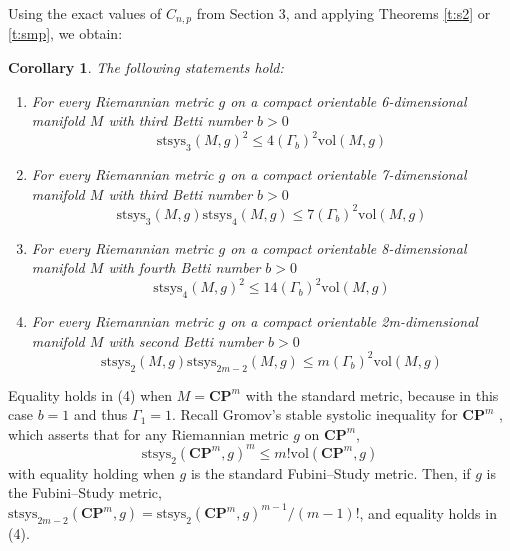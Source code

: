 \documentclass[12pt]{amsart}
\newtheorem{corollary}[theorem]{Corollary}
\theoremstyle{definition}
\theoremstyle{remark}
\numberwithin{equation}{section}
\begin{document}
Using the exact values of $C_{n,p}$ from Section 3, and applying Theorems \ref{t:s2}  or \ref{t:smp}, we obtain: 
 \begin{corollary}%
The following statements hold:
 \begin{enumerate}
\item For every Riemannian metric $g$ on a compact orientable 6-dimensional manifold $M$ with third Betti number $b>0$
\begin{equation*} \mathrm{stsys}_3(M,g)^2 \leq 4  (\Gamma_b)^2 \mathrm{vol}(M,g)\end{equation*}

\item For every Riemannian metric $g$ on a compact orientable 7-dimensional manifold $M$ with third Betti number $b>0$
\begin{equation*} \mathrm{stsys}_3(M,g) \mathrm{stsys}_4(M,g) \leq 7  (\Gamma_b)^2 \mathrm{vol}(M,g)\end{equation*}

\item For every Riemannian metric $g$ on a compact orientable 8-dimensional manifold $M$ with fourth Betti number $b>0$
\begin{equation*} \mathrm{stsys}_4(M,g)^2 \leq 14  (\Gamma_b)^2 \mathrm{vol}(M,g)\end{equation*}

\item For every Riemannian metric $g$ on a compact orientable 2m-dimensional manifold $M$ with second Betti number $b>0$
\begin{equation*} \mathrm{stsys}_2(M,g) \mathrm{stsys}_{2m-2}(M,g) \leq m  (\Gamma_b)^2 \mathrm{vol}(M,g)\end{equation*}
\end{enumerate}
\end{corollary}

Equality holds in (4) when $M=\mathbf{CP}^m$ with the standard metric, because in this case $b=1$ and thus $\Gamma_1=1$.  Recall Gromov's stable systolic inequality for $\mathbf{CP}^m$ \cite[Theorem 4.36]{MG}, which asserts that for any Riemannian metric $g$ on  $\mathbf{CP}^m$,
$$ \mathrm{stsys}_2(\mathbf{CP}^m,g) ^m \leq m! \mathrm{vol}(\mathbf{CP}^m,g) $$
with equality holding when $g$ is the standard Fubini--Study metric.  Then, if $g$ is the Fubini--Study metric, $\mathrm{stsys}_{2m-2}(\mathbf{CP}^m,g) = \mathrm{stsys}_2(\mathbf{CP}^m,g)^{m-1}/(m-1)!$, and equality holds in (4).
\end{document}
